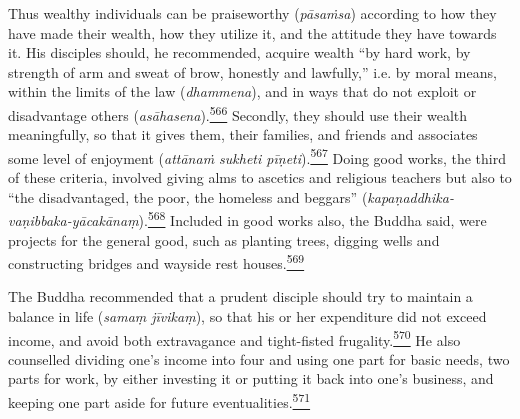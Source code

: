 Thus wealthy individuals can be praiseworthy (\emph{pāsaṁsa}) according
to how they have made their wealth, how they utilize it, and the
attitude they have towards it. His disciples should, he recommended,
acquire wealth ``by hard work, by strength of arm and sweat of brow,
honestly and lawfully,'' i.e. by moral means, within the limits of the
law (\emph{dhammena}), and in ways that do not exploit or disadvantage
others
(\emph{asāhasena}).\label{footprints_split_015.html_fnref566}\hyperref[footprints_split_025.htmlux5cux23fn566]{\textsuperscript{566}}
Secondly, they should use their wealth meaningfully, so that it gives
them, their families, and friends and associates some level of enjoyment
(\emph{attānaṁ sukheti
pīṇeti}).\label{footprints_split_015.html_fnref567}\hyperref[footprints_split_025.htmlux5cux23fn567]{\textsuperscript{567}}
Doing good works, the third of these criteria, involved giving alms to
ascetics and religious teachers but also to ``the disadvantaged, the
poor, the homeless and beggars''
(\emph{kapaṇaddhika-vaṇibbaka-yācakānaṃ}).\label{footprints_split_015.html_fnref568}\hyperref[footprints_split_025.htmlux5cux23fn568]{\textsuperscript{568}}
Included in good works also, the Buddha said, were projects for the
general good, such as planting trees, digging wells and constructing
bridges and wayside rest
houses.\label{footprints_split_015.html_fnref569}\hyperref[footprints_split_025.htmlux5cux23fn569]{\textsuperscript{569}}

The Buddha recommended that a prudent disciple should try to maintain a
balance in life (\emph{samaṃ jīvikaṃ}), so that his or her expenditure
did not exceed income, and avoid both extravagance and tight-fisted
frugality.\label{footprints_split_015.html_fnref570}\hyperref[footprints_split_025.htmlux5cux23fn570]{\textsuperscript{570}}
He also counselled dividing one's income into four and using one part
for basic needs, two parts for work, by either investing it or putting
it back into one's business, and keeping one part aside for future
eventualities.\label{footprints_split_015.html_fnref571}\hyperref[footprints_split_025.htmlux5cux23fn571]{\textsuperscript{571}}


